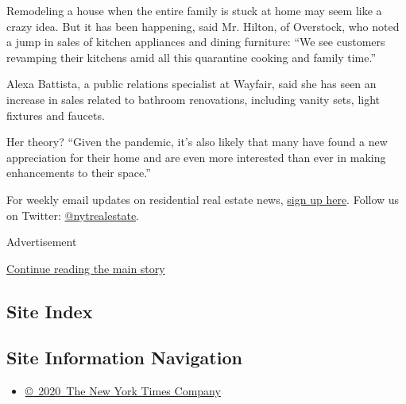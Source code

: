 Remodeling a house when the entire family is stuck at home may seem like
a crazy idea. But it has been happening, said Mr. Hilton, of Overstock,
who noted a jump in sales of kitchen appliances and dining furniture:
``We see customers revamping their kitchens amid all this quarantine
cooking and family time.''

Alexa Battista, a public relations specialist at Wayfair, said she has
seen an increase in sales related to bathroom renovations, including
vanity sets, light fixtures and faucets.

Her theory? ``Given the pandemic, it's also likely that many have found
a new appreciation for their home and are even more interested than ever
in making enhancements to their space.''

For weekly email updates on residential real estate news,
\href{http://www.nytimes.com/newsletters/realestate/}{sign up here}.
Follow us on Twitter:
\href{https://twitter.com/nytrealestate}{@nytrealestate}.

Advertisement

\protect\hyperlink{after-bottom}{Continue reading the main story}

\hypertarget{site-index}{%
\subsection{Site Index}\label{site-index}}

\hypertarget{site-information-navigation}{%
\subsection{Site Information
Navigation}\label{site-information-navigation}}

\begin{itemize}
\tightlist
\item
  \href{https://help.nytimes.com/hc/en-us/articles/115014792127-Copyright-notice}{©~2020~The
  New York Times Company}
\end{itemize}

